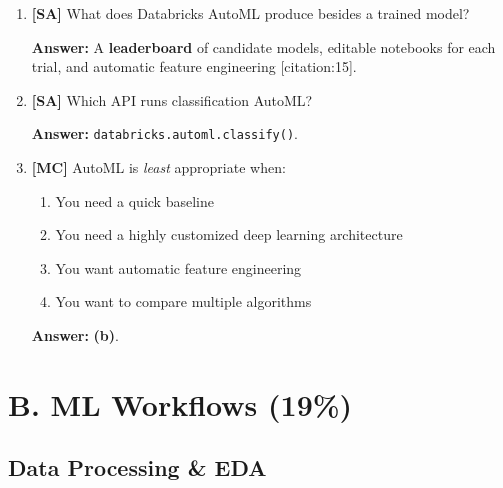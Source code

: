 \documentclass[11pt]{article}
\begin{document}
	\begin{enumerate}[leftmargin=*, label=\textbf{Q\arabic*.}, start=13]
		
		\item \textbf{[SA]} What does Databricks AutoML produce besides a trained model?
		
		\textbf{Answer:} A \textbf{leaderboard} of candidate models, editable notebooks for each trial, and automatic feature engineering [citation:15].
		
		\item \textbf{[SA]} Which API runs classification AutoML?
		
		\textbf{Answer:} \texttt{databricks.automl.classify()}.
		
		\item \textbf{[MC]} AutoML is \emph{least} appropriate when:
		\begin{enumerate}[label=(\alph*)]
			\item You need a quick baseline
			\item You need a highly customized deep learning architecture
			\item You want automatic feature engineering
			\item You want to compare multiple algorithms
		\end{enumerate}
		
		\textbf{Answer:} \textbf{(b)}.
		
	\end{enumerate}
	
	\newpage
	\section{B. ML Workflows (19\%)}
	
	\subsection*{Data Processing \& EDA}
	
\end{document}
